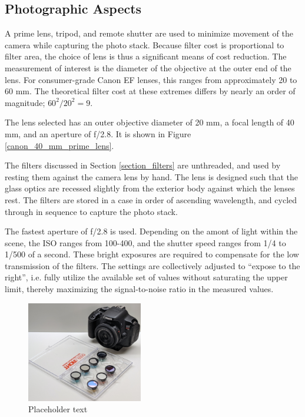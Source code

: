 \documentclass[twocolumn,10pt]{asme2ej}
\newcommand{\id}{\hspace{6 mm}}
\begin{document}
\subsection{Photographic Aspects}
\label{photographic}

A prime lens, tripod, and remote shutter are used to minimize movement of the camera while capturing the photo stack. Because filter cost is proportional to filter area, the choice of lens is thus a significant means of cost reduction. The measurement of interest is the diameter of the objective at the outer end of the lens. For consumer-grade Canon EF lenses, this ranges from approximately 20 to 60 mm. The theoretical filter cost at these extremes differs by nearly an order of magnitude; $60^2 / 20^2 = 9$.

\id The lens selected has an outer objective diameter of 20 mm, a focal length of 40 mm, and an aperture of f/2.8. It is shown in Figure \ref{canon_40_mm_prime_lens}.

\id The filters discussed in Section \ref{section_filters} are unthreaded, and used by resting them against the camera lens by hand. The lens is designed such that the glass optics are recessed slightly from the exterior body against which the lenses rest. The filters are stored in a case in order of ascending wavelength, and cycled through in sequence to capture the photo stack.

\id The fastest aperture of f/2.8 is used. Depending on the amont of light within the scene, the ISO ranges from 100-400, and the shutter speed ranges from 1/4 to 1/500 of a second. These bright exposures are required to compensate for the low transmission of the filters. The settings are collectively adjusted to ``expose to the right'', i.e. fully utilize the available set of values without saturating the upper limit, thereby maximizing the signal-to-noise ratio in the measured values.

\begin{figure}
\centering
\includegraphics[width=0.45\textwidth]{IMG_20210712_212507_GIMP.jpg}
\caption{Placeholder text}
\label{canon}
\end{figure}
\end{document}
